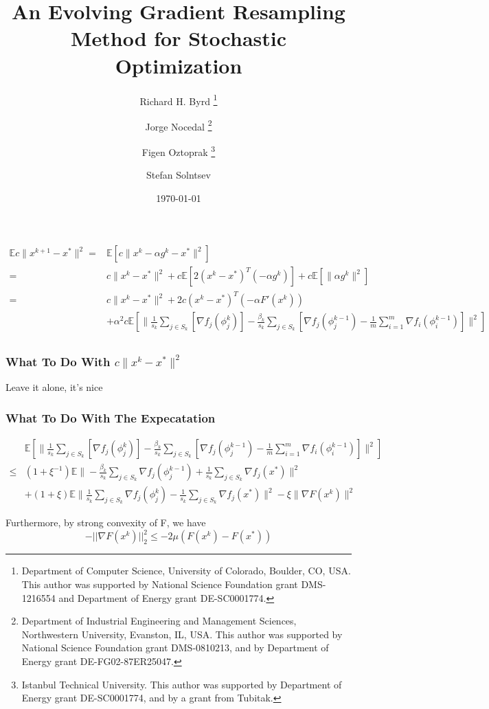\documentclass[12pt]{article}
\title{An Evolving Gradient Resampling Method for Stochastic Optimization}
\author{Richard H. Byrd 
\thanks{Department of Computer Science, University of Colorado, Boulder, CO, USA. This author was supported by National Science Foundation grant DMS-1216554 and Department of Energy grant DE-SC0001774.} 
\and Jorge Nocedal 
\thanks{Department of Industrial Engineering and Management Sciences, Northwestern University, Evanston, IL, USA. This author was supported by National Science Foundation grant DMS-0810213, and by Department of Energy grant DE-FG02-87ER25047.} 
\and Figen Oztoprak 
\thanks{Istanbul Technical University. This author was supported by Department of Energy grant DE-SC0001774, and by a grant from Tubitak.} 
\and Stefan Solntsev }
\date{\today}
\begin{document}
\begin{align*}
	\mathbb{E} c \|x^{k+1} - x^* \|^2  =& \mathbb{E} \left[ c \|x^k - \alpha g^k - x^* \|^2 \right] \\
	=&  c\|x^k - x^* \|^2  +  c\mathbb{E} \left[ 2 (x^k - x^* )^T (- \alpha g^k) \right]  +  c\mathbb{E} \left[  \|\alpha g^k \|^2 \right] \\
	=&  c\|x^k - x^* \|^2  + 2 c(x^k - x^* )^T (- \alpha  F'(x^k)) \\
	&+ \alpha^2 c\mathbb{E} \left[  \|\frac{1}{s_k} \sum_{j \in S_k} \left[  \nabla f_j(\phi_j^{k}) \right]- \frac{ \beta_k }{s_k} \sum_{j \in S_k} \left[  \nabla f_j(\phi^{k-1}_j) - \frac{1}{m} \sum_{i = 1}^{m }  \nabla f_i (\phi_i^{k-1}) \right]  \|^2 \right] \\
\end{align*}

\subsubsection{What To Do With $c\|x^k - x^* \|^2$}
Leave it alone, it's nice



\subsubsection{What To Do With The Expecatation}

\begin{align*}
	& \mathbb{E} \left[  \|\frac{1}{s_k} \sum_{j \in S_k} \left[  \nabla f_j(\phi_j^{k}) \right]- \frac{ \beta_k }{s_k} \sum_{j \in S_k} \left[  \nabla f_j(\phi^{k-1}_j) - \frac{1}{m} \sum_{i = 1}^{m }  \nabla f_i (\phi_i^{k-1}) \right]  \|^2 \right] \\
	\leq  & (1+\xi^{-1})\mathbb{E}   \|  - \frac{ \beta_k }{s_k} \sum_{j \in S_k}  \nabla f_j(\phi^{k-1}_j) + \frac{ 1}{s_k} \sum_{j \in S_k}  \nabla f_j(x^*)\|^2 \\
&+ (1+\xi) \mathbb{E} \| \frac{1}{s_k} \sum_{j \in S_k}  \nabla f_j(\phi_j^{k}) - \frac{ 1 }{s_k} \sum_{j \in S_k}  \nabla f_j(x^*)\|^2  - \xi\|  \nabla F (x^k) \|^2  
	\end{align*}
	
	Furthermore, by strong convexity of F, we have
	\begin{equation}
		 - ||\nabla F(x^k)||_2^2  \leq -2\mu (F(x^k) - F(x^*))
	\end{equation}
\end{document}
